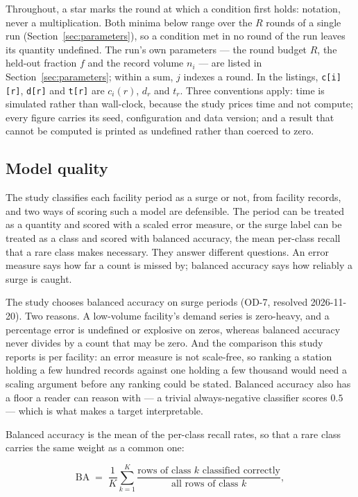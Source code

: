 \noindent
Throughout, a star marks the round at which a condition first holds: notation, never a
multiplication. Both minima below range over the
$R$ rounds of a single run (Section~\ref{sec:parameters}), so a condition met in no round of the
run leaves its quantity undefined. The run's own parameters --- the round budget $R$, the
held-out fraction $f$ and the record volume $n_i$ --- are listed in
Section~\ref{sec:parameters}; within a sum, $j$ indexes a round. In the listings,
\texttt{c[i][r]}, \texttt{d[r]} and \texttt{t[r]} are $c_i(r)$, $d_r$ and $t_r$. Three
conventions apply: time is
simulated rather than wall-clock, because the study prices time and not compute; every figure
carries its seed, configuration and data version; and a result that cannot be computed is printed
as undefined rather than coerced to zero.

\subsection{Model quality}
\label{sec:quality}

The study classifies each facility period as a surge or not, from facility records, and two ways
of scoring such a model are defensible. The period can be treated as a quantity and scored with a
scaled error measure, or the surge label can be treated as a class and scored with balanced
accuracy, the mean per-class recall that a rare class makes necessary. They answer different
questions. An error measure says how far a count is missed by; balanced accuracy says how reliably
a surge is caught.

The study chooses balanced accuracy on surge periods (OD-7, resolved 2026-11-20). Two reasons. A
low-volume facility's demand series is zero-heavy, and a percentage error is undefined or explosive
on zeros, whereas balanced accuracy never divides by a count that may be zero. And the comparison
this study reports is per facility: an error measure is not scale-free, so ranking a station
holding a few hundred records against one holding a few thousand would need a scaling argument
before any ranking could be stated. Balanced accuracy also has a floor a reader can reason with ---
a trivial always-negative classifier scores $0.5$ --- which is what makes a target interpretable.

\noindent
Balanced accuracy is the mean of the per-class recall rates, so that a rare class carries the same
weight as a common one:

\begin{equation}
\mathrm{BA} \;=\; \frac{1}{K}\sum_{k=1}^{K}
  \frac{\text{rows of class } k \text{ classified correctly}}{\text{all rows of class } k},
\label{eq:ba}
\end{equation}

